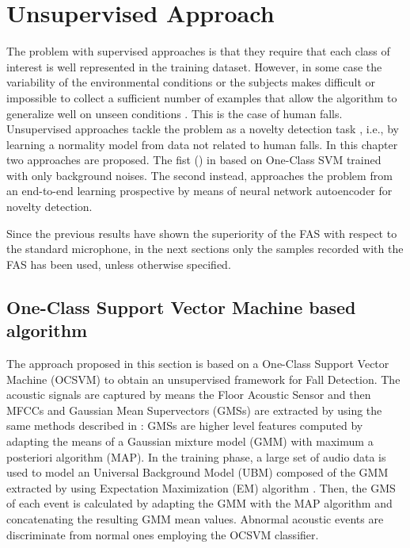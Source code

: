 \chapter{Unsupervised Approach}
\label{ch:unsupervised_approaches}

The problem with supervised approaches is that they require that each class of interest is well represented in the training dataset. However, in some case the variability of the environmental conditions or the subjects makes difficult or impossible to collect a sufficient number of examples that allow the algorithm to generalize well on unseen conditions \cite{Noury2007}. This is the case of human falls. Unsupervised approaches tackle the problem as a novelty detection task \cite{markou2003novelty1,markou2003novelty2}, i.e., by learning a normality model from data not related to human falls. In this chapter two approaches are proposed. The fist () in based on One-Class SVM  trained with only background noises. The second  instead, approaches the problem from an end-to-end learning prospective by means of neural network autoencoder  for novelty detection.

Since the previous results have shown the superiority of the FAS with respect to the standard microphone, in the next sections only the samples recorded with the FAS has been used, unless otherwise specified.

\section{One-Class Support Vector Machine based algorithm}
\label{sec:ocsvm_approach}

The approach proposed in this section is based on a One-Class Support Vector Machine (OCSVM) \cite{scholkopf2000} to obtain an unsupervised framework for Fall Detection.
The acoustic signals are captured by means the Floor Acoustic Sensor and then MFCCs and Gaussian Mean Supervectors (GMSs) are extracted by using the same methods described in : GMSs are higher level features computed by adapting the means of a Gaussian mixture model (GMM) with maximum a posteriori algorithm (MAP).
In the training phase, a large set of audio data is used to model an Universal Background Model (UBM) composed of the GMM extracted by using Expectation Maximization (EM) algorithm \cite{bilmes1998gentle}.
Then, the GMS of each event is calculated by adapting the GMM with the MAP algorithm and concatenating the resulting GMM mean values.
Abnormal acoustic events are discriminate from normal ones employing the OCSVM classifier.


